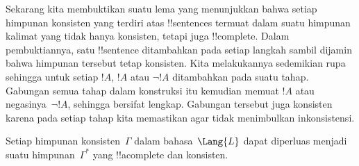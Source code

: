 \documentclass[../../../include/open-logic-section]{subfiles}
\begin{document}
      {}
      {}


\begin{explain}
Sekarang kita membuktikan suatu lema yang menunjukkan bahwa setiap
himpunan konsisten yang terdiri atas !!{sentence}s termuat dalam suatu
himpunan kalimat yang tidak hanya konsisten, tetapi juga !!{complete}.
Dalam pembuktiannya, satu !!{sentence} ditambahkan pada setiap
langkah sambil dijamin bahwa himpunan tersebut tetap konsisten. Kita
melakukannya sedemikian rupa sehingga untuk setiap $!A$, $!A$ atau
$\lnot !A$ ditambahkan pada suatu tahap. Gabungan semua tahap dalam
konstruksi itu kemudian memuat $!A$ atau negasinya~$\lnot !A$, sehingga
bersifat lengkap. Gabungan tersebut juga konsisten karena pada setiap
tahap kita memastikan agar tidak menimbulkan inkonsistensi.
\end{explain}

\begin{lem}
 Setiap himpunan konsisten~$\Gamma$ dalam
bahasa~$\Lang{L}$ dapat diperluas menjadi suatu himpunan~$\Gamma^*$ yang
!!a{complete} dan konsisten.
\end{lem}
\end{document}
